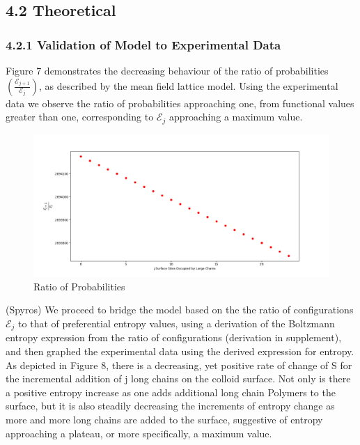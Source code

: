 \documentclass[journal=mamobx,manuscript=article]{achemso}
\begin{document}
\subsection{4.2 Theoretical}

\subsubsection{4.2.1 Validation of Model to Experimental Data}

Figure 7 demonstrates the decreasing behaviour of the ratio of probabilities $\left(\frac{\mathcal{E}_{j+1}}{\mathcal{E}_j}\right)$, as described by the mean field lattice model. Using the experimental data we observe the ratio of probabilities approaching one, from functional values greater than one, corresponding to $\mathcal{E}_j$ approaching a maximum value.


\begin{figure}[H]
\includegraphics[scale=0.50]{fig11.png}
\caption{Ratio of Probabilities}
\label{figure 11}
\end{figure}

(Spyros)
We proceed to bridge the model based on the the ratio of configurations $\mathcal{E}_{j}$ to that of preferential entropy values, using a derivation of the Boltzmann entropy expression from the ratio of configurations (derivation in supplement), and then graphed the experimental data using the derived expression for entropy. As depicted in Figure 8, there is a decreasing, yet positive rate of change of S for the incremental addition of j long chains on the colloid surface. Not only is there a positive entropy increase as one adds additional long chain Polymers to the surface, but it is also steadily decreasing the increments of entropy change as more and more long chains are added to the surface, suggestive of entropy approaching a plateau, or more specifically, a maximum value. 
\end{document}
